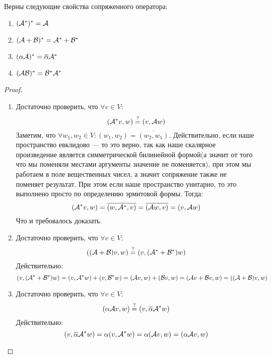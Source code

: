 \documentclass[../main.tex]{subfiles}
\begin{document}
\begin{theorem-non}
  Верны следующие свойства сопряженного оператора:
  \begin{enumerate}
    \item $(\mathcal{A}^{*})^{*} = \mathcal{A}$
    \item $(\mathcal{A} + \mathcal{B})^{*} = \mathcal{A}^{*} + \mathcal{B}^{*}$
    \item $(\alpha \mathcal{A})^{*} = \overline{\alpha} \mathcal{A}^{*}$
    \item $(\mathcal{A} \mathcal{B})^{*} = \mathcal{B}^{*} \mathcal{A}^{*}$
  \end{enumerate}
\end{theorem-non}
\begin{proof}
  \begin{enumerate}
    \item Достаточно проверить, что $\forall v \in V$:
    \begin{equation*}
      (\mathcal{A}^{*} v, w) \overset{?}{=} (v, \mathcal{A} w)
    \end{equation*}
    Заметим, что $\forall w_1, w_2 \in V\colon (w_1, w_2) = \overline{(w_2, w_1)}$. Действительно, если наше пространство евклидово --- то это верно, так как наше скалярное произведение является симметрической билинейной формой(а значит от того что мы поменяли местами аргументы значение не поменяется), при этом мы работаем в поле вещественных чисел, а значит сопряжение также не поменяет результат. При этом если наше пространство унитарно, то это выполнено просто по определению эрмитовой формы. Тогда:
    \begin{equation*}
      (\mathcal{A}^{*} v, w) =
      \overline{(w, \mathcal{A}^{*}, v)} =
      \overline{(\mathcal{A} w, v)} =
      (v, \mathcal{A} w)
    \end{equation*}
    Что и требовалось доказать.

    \item Достаточно проверить, что $\forall v \in V$:
    \begin{equation*}
      ((\mathcal{A} + \mathcal{B})v, w) \overset{?}{=} (v, (\mathcal{A}^{*} + \mathcal{B}^{*}) w)
    \end{equation*}
    Действительно:
    \begin{equation*}
      (v, (\mathcal{A}^{*} + \mathcal{B}^{*}) w) =
      (v, \mathcal{A}^{*} w) + (v, \mathcal{B}^{*} w) =
      (\mathcal{A} v, w) + (\mathcal{B} v, w) =
      (\mathcal{A} v + \mathcal{B} v, w) =
      ((\mathcal{A} + \mathcal{B})v, w)
    \end{equation*}

    \item Достаточно проверить, что $\forall v \in V$:
    \begin{equation*}
      (\alpha \mathcal{A} v, w) \overset{?}{=} (v, \overline{\alpha} \mathcal{A}^{*} w)
    \end{equation*}
    Действительно:
    \begin{equation*}
      (v, \overline{\alpha} \mathcal{A}^{*} w) =
      \alpha (v, \mathcal{A}^{*} w) =
      \alpha (\mathcal{A} v, w) =
      (\alpha \mathcal{A} v, w)
    \end{equation*}


\end{enumerate}
\end{proof}
\end{document}

